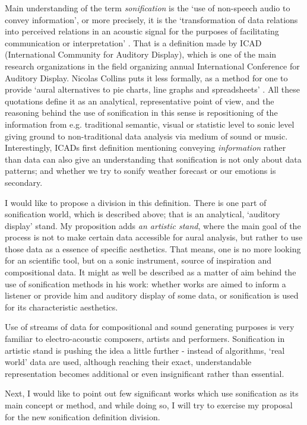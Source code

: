 \documentclass[11pt,a4paper,oneside]{report}
\begin{document}
Main understanding of the term \textit{sonification} is the `use of non-speech audio to convey information', or more precisely, it is the `transformation of data relations into perceived relations in an acoustic signal for the purposes of facilitating communication or interpretation' \cite{Fitch}. That is a definition made by ICAD (International Community for Auditory Display), which is one of the main research organizations in the field organizing annual International Conference for Auditory Display. Nicolas Collins puts it less formally, as a method for one to provide `aural alternatives to pie charts, line graphs and spreadsheets' \cite{Collins2006}. All these quotations define it as an analytical, representative point of view, and the reasoning behind the use of sonification in this sense is repositioning of the information from e.g. traditional semantic, visual or statistic level to sonic level giving ground to non-traditional data analysis via medium of sound or music. Interestingly, ICADs first definition mentioning conveying \textit{information} rather than data can also give an understanding that sonification is not only about data patterns; and whether we try to sonify weather forecast or our emotions is secondary.

I would like to propose a division in this definition. There is one part of sonification world, which is described above; that is an analytical, `auditory display' stand. My proposition adds \textit{an artistic stand}, where the main goal of the process is not to make certain data accessible for aural analysis, but rather to use those data as a essence of specific aesthetics. That means, one is no more looking for an scientific tool, but on a sonic instrument, source of inspiration and compositional data. It might as well be described as a matter of aim behind the use of sonification methods in his work: whether works are aimed to inform a listener or provide him and auditory display of some data, or sonification is used for its characteristic aesthetics.

Use of streams of data for compositional and sound generating purposes is very familiar to electro-acoustic composers, artists and performers. Sonification in artistic stand is pushing the idea a little further - instead of algorithms, `real world' data are used, although reaching their exact, understandable representation becomes additional or even insignificant rather than essential.

Next, I would like to point out few significant works which use sonification as its main concept or method, and while doing so, I will try to exercise my proposal for the new sonification definition division.
\end{document}
